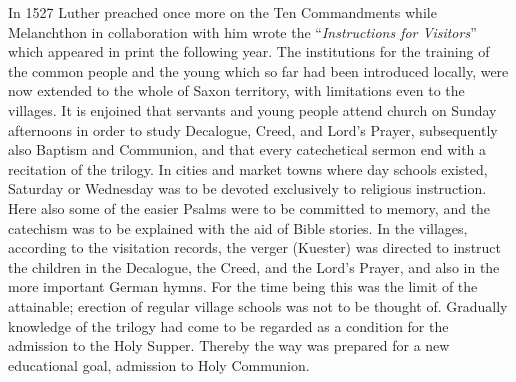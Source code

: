 In 1527 Luther preached once more on the Ten Commandments while Melanchthon in collaboration with him wrote the “\emph{Instructions for Visitors}” which appeared in print the following year. The institutions for the training of the common people and the young which so far had been introduced locally, were now extended to the whole of Saxon territory, with limitations even to the villages. It is enjoined that servants and young people attend church on Sunday afternoons in order to study Decalogue, Creed, and Lord’s Prayer, subsequently also Baptism and Communion, and that every catechetical sermon end with a recitation of the trilogy. In cities and market towns where day schools existed, Saturday or Wednesday was to be devoted exclusively to religious instruction. Here also some of the easier Psalms were to be committed to memory, and the catechism was to be explained with the aid of Bible stories. In the villages, according to the visitation records, the verger (Kuester) was directed to instruct the children in the Decalogue, the Creed, and the Lord’s Prayer, and also in the more important German hymns. For the time being this was the limit of the attainable; erection of regular village schools was not to be thought of. Gradually knowledge of the trilogy had come to be regarded as a condition for the admission to the Holy Supper. Thereby the way was prepared for a new educational goal, admission to Holy Communion.


